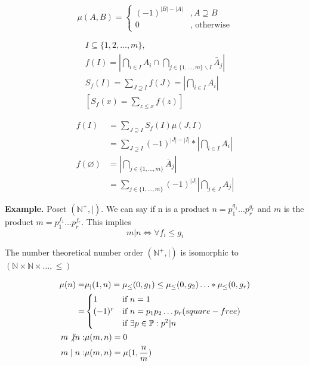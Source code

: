 \[
  \mu (A,B) = \begin{cases} 
    (-1)^{|B| - |A|} &, A\supseteq B\\ 
    0                & \text{, otherwise}
  \end{cases}
\]

\begin{gather*}
  I \subseteq \{ 1,2, \ldots, m\}, \\
  f(I) = \left| \bigcap_{i\in I} A_i \cap 
    \bigcap_{j \in \{1,\ldots ,m\} \backslash I} \bar{A}_j \right| \\
  S_f(I) = \sum_{J \supseteq I} f(J) = \left| \bigcap_{i\in I} A_i  \right| \\
  \left[ S_f(x) = \sum_{z\leq x} f(z) \right]
\end{gather*}

\begin{align*}
  f(I) &= \sum_{J \supseteq I} S_f(I) \mu(J,I) \\
    &= \sum_{J \supseteq I} (-1)^{|J| - |I|} * \left| \bigcap_{i\in I} A_i \right| \\
  f(\varnothing) &= \left| \bigcap_{j \in \{1,\ldots ,m\}} \bar{A}_j \right| \\
    &= \sum_{j \in \{1,\ldots ,m\}} (-1)^{|J|} \left| \bigcap_{j \in J} A_j \right|
\end{align*}

\textbf{Example.}
Poset $(\mathbb{N}^{+}, \mid)$.
We can say if n is a product $n = p_1^{g_1} \ldots p_r^{g_r}$ and $m$ is the product $m = p_1^{f_1} \ldots p_r^{f_r}$. This implies 
\[
  m|n \iff \forall f_i \leq g_i
\]

The number theoretical number order $(\mathbb{N}^{+}, \mid)$ is isomorphic to $(\mathbb{N} \times \mathbb{N} \times \ldots , \leq)$

\begin{align*}
  \mu(n) =& \mu_{|}(1,n) = \mu_{\leq}(0,g_1) \leq \mu_{\leq}(0,g_2) \ldots * \mu_{\leq}(0,g_r) \\
    =& \begin{cases} 
      1 & \text{if } n=1 \\
      (-1)^r & \text{if } n = p_1 p_2 \ldots p_r \text( square-free) \\
       & \text{if } \exists p\in \mathbb{P}: p^2|n
     \end{cases} \\
  m \not| n: &\mu(m,n) = 0 \\
  m \mid n:  &\mu(m,n) = \mu(1, \frac{n}{m}) \\
\end{align*}


